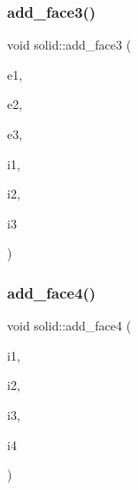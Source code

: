 \subsubsection{\texorpdfstring{add\+\_\+face3()}{add\_face3()}}
{\footnotesize\ttfamily void solid\+::add\+\_\+face3 (\begin{DoxyParamCaption}\item[{\mbox{\hyperlink{galois_8h_a09fddde158a3a20bd2dcadb609de11dc}{I\+NT}}}]{e1,  }\item[{\mbox{\hyperlink{galois_8h_a09fddde158a3a20bd2dcadb609de11dc}{I\+NT}}}]{e2,  }\item[{\mbox{\hyperlink{galois_8h_a09fddde158a3a20bd2dcadb609de11dc}{I\+NT}}}]{e3,  }\item[{\mbox{\hyperlink{galois_8h_a09fddde158a3a20bd2dcadb609de11dc}{I\+NT}}}]{i1,  }\item[{\mbox{\hyperlink{galois_8h_a09fddde158a3a20bd2dcadb609de11dc}{I\+NT}}}]{i2,  }\item[{\mbox{\hyperlink{galois_8h_a09fddde158a3a20bd2dcadb609de11dc}{I\+NT}}}]{i3 }\end{DoxyParamCaption})}

\mbox{\label{classsolid_ae0c74bc52056d190e54a60c78c1858a2}} 
\subsubsection{\texorpdfstring{add\+\_\+face4()}{add\_face4()}}
{\footnotesize\ttfamily void solid\+::add\+\_\+face4 (\begin{DoxyParamCaption}\item[{\mbox{\hyperlink{galois_8h_a09fddde158a3a20bd2dcadb609de11dc}{I\+NT}}}]{i1,  }\item[{\mbox{\hyperlink{galois_8h_a09fddde158a3a20bd2dcadb609de11dc}{I\+NT}}}]{i2,  }\item[{\mbox{\hyperlink{galois_8h_a09fddde158a3a20bd2dcadb609de11dc}{I\+NT}}}]{i3,  }\item[{\mbox{\hyperlink{galois_8h_a09fddde158a3a20bd2dcadb609de11dc}{I\+NT}}}]{i4 }\end{DoxyParamCaption})}

\mbox{\label{classsolid_a56243f48f4573b2989154be1dca68713}} 
